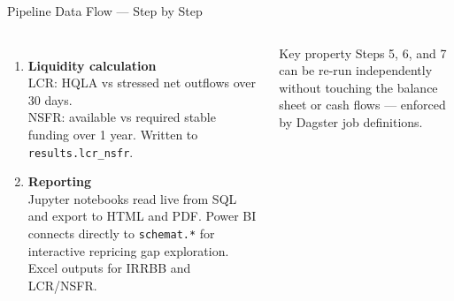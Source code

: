 \documentclass[aspectratio=169,10pt]{beamer}
\begin{document}
\begin{frame}{Pipeline Data Flow — Step by Step}
\begin{columns}[T]
\begin{enumerate}
        \vspace{4pt}
        \item[\textbf{6.}] \textbf{Liquidity calculation}\\
          LCR: HQLA vs stressed net outflows over 30 days.\\
          NSFR: available vs required stable funding over 1 year.
          Written to \texttt{results.lcr\_nsfr}.

        \vspace{4pt}
        \item[\textbf{7.}] \textbf{Reporting}\\
          Jupyter notebooks read live from SQL and export
          to HTML and PDF.
          Power BI connects directly to \texttt{schemat.*}
          for interactive repricing gap exploration.
          Excel outputs for IRRBB and LCR/NSFR.
      \end{enumerate}

      \vspace{6pt}
      \begin{block}{Key property}
        \small Steps 5, 6, and 7 can be re-run independently
        without touching the balance sheet or cash flows —
        enforced by Dagster job definitions.
      \end{block}
  \end{columns}
\end{frame}
\end{document}
